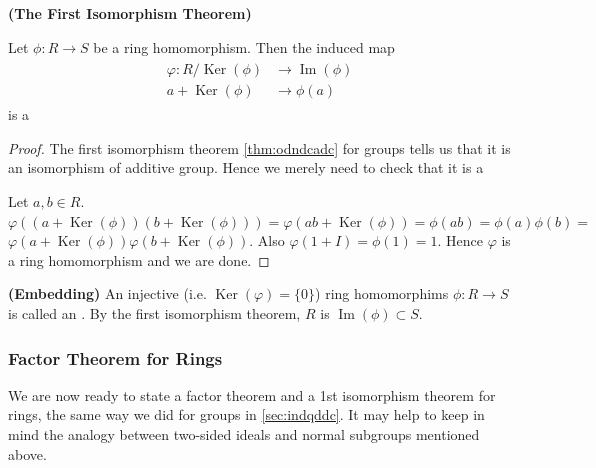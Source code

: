 \documentclass{article}
\newcommand{\bfs}[1]{\textbf{({#1}) }}
\newcommand{\Ker}{\operatorname{Ker}}
\begin{document}
\begin{thma}\bfs{The First Isomorphism Theorem}\label{thm:aoindacca}

 Let $\phi: R \rightarrow S$ be a ring homomorphism. Then the induced map
\begin{align*}
\begin{aligned}
\varphi: R / \Ker(\phi) & \longrightarrow \operatorname{Im}(\phi) \\
a+\Ker(\phi) & \longrightarrow \phi(a)
\end{aligned}
\end{align*}
is a 
\end{thma}
\begin{proof}
The first isomorphism theorem \cref{thm:odndcadc} for groups tells us that it is an isomorphism of additive group. Hence we merely need to check that it is a 

Let $a, b \in R$. $\varphi((a+\Ker(\phi))(b+\Ker(\phi)))=\varphi(a b+\Ker(\phi))=\phi(a b)=\phi(a) \phi(b)=$ $\varphi(a+\Ker(\phi)) \varphi(b+\Ker(\phi))$. Also $\varphi(1+I)=\phi(1)=1$.
Hence $\varphi$ is a ring homomorphism and we are done.
\end{proof}
\begin{defa}\bfs{Embedding}
  An injective (i.e. $\Ker(\varphi)=\{0\}$) ring homomorphims $\phi: R \rightarrow S$ is called an . By the first isomorphism theorem, $R$ is  $\operatorname{Im}(\phi) \subset S$.
\end{defa}

\subsubsection{Factor Theorem for Rings}
We are now ready to state a factor theorem and a 1st isomorphism theorem for rings, the same way we did for groups in \cref{sec:indqddc}. It may help to keep in mind the analogy between two-sided ideals and normal subgroups mentioned above.
\end{document}
